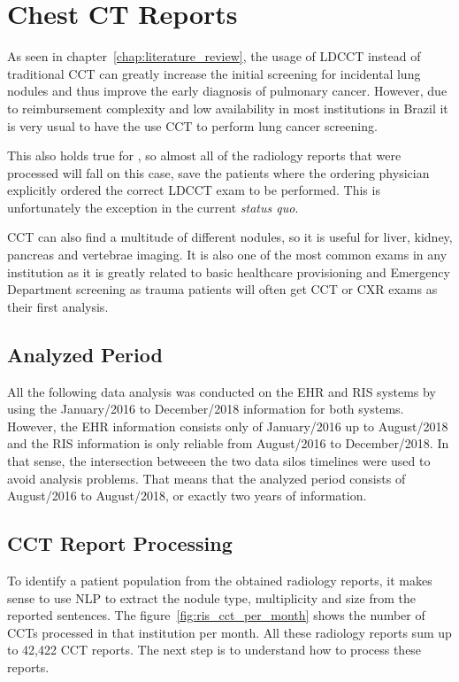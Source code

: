 \section{Chest CT Reports} 

As seen in chapter~\ref{chap:literature_review}, the usage of LDCCT instead of traditional CCT can greatly increase the initial screening for incidental lung nodules and thus improve the early diagnosis of pulmonary cancer. However, due to reimbursement complexity and low availability in most institutions in Brazil it is very usual to have the use CCT to perform lung cancer screening.

This also holds true for \nomeHsl{}, so almost all of the radiology reports that were processed will fall on this case, save the patients where the ordering physician explicitly ordered the correct LDCCT exam to be performed. This is unfortunately the exception in the current \emph{status quo}.

CCT can also find a multitude of different nodules, so it is useful for liver, kidney, pancreas and vertebrae imaging. It is also one of the most common exams in any institution as it is greatly related to basic healthcare provisioning and Emergency Department screening as trauma patients will often get CCT or CXR exams as their first analysis.

\subsection{Analyzed Period}

All the following data analysis was conducted on the EHR and RIS systems by using the January/2016 to December/2018 information for both systems. However, the EHR information consists only of January/2016 up to August/2018 and the RIS information is only reliable from August/2016 to December/2018. In that sense, the intersection betweeen the two data silos timelines were used to avoid analysis problems. That means that the analyzed period consists of August/2016 to August/2018, or exactly two years of information. 

\subsection{CCT Report Processing}

To identify a patient population from the obtained radiology reports, it makes sense to use NLP to extract the nodule type, multiplicity and size from the reported sentences. The figure~\ref{fig:ris_cct_per_month} shows the number of CCTs processed in that institution per month. All these radiology reports sum up to 42,422 CCT reports. The next step is to understand how to process these reports.

